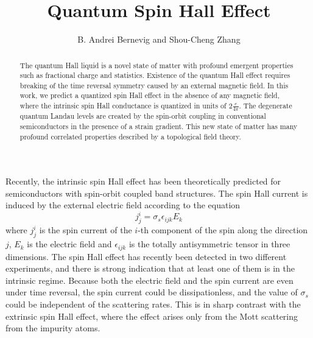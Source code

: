 \documentclass[prl,aps,amssymb,shownopacs,twocolumn]{revtex4}
\begin{document}
	
	
	
	
	\title{Quantum Spin Hall Effect}
	
	\author {B. Andrei Bernevig and Shou-Cheng Zhang}
	
	\begin{abstract}
		\begin{center}
			
			\parbox{14cm}{The quantum Hall liquid is a novel state of matter
				with profound emergent properties such as fractional charge and
				statistics. Existence of the quantum Hall effect requires breaking
				of the time reversal symmetry caused by an external magnetic field.
				In this work, we predict a quantized spin Hall effect in the absence
				of any magnetic field, where the intrinsic spin Hall conductance is
				quantized in units of $2 \frac{e}{4\pi}$. The degenerate quantum
				Landau levels are created by the spin-orbit coupling in conventional
				semiconductors in the presence of a strain gradient. This new state
				of matter has many profound correlated properties described by a
				topological field theory.}
			
		\end{center}
	\end{abstract}
	
	
	\maketitle
	
	Recently, the intrinsic spin Hall effect has been theoretically
	predicted for semiconductors with spin-orbit coupled band
	structures\cite{murakami2003,sinova2004}. The spin Hall current is
	induced by the external electric field according to the equation
	\begin{equation}
		j_j^i = \sigma_s \epsilon_{ijk} E_k \label{spin_response}
	\end{equation}
	where $j_j^i$ is the spin current of the $i$-th component of the
	spin along the direction $j$, $E_k$ is the electric field and
	$\epsilon_{ijk}$ is the totally antisymmetric tensor in three
	dimensions. The spin Hall effect has recently been detected in two
	different experiments\cite{kato2004A,wunderlich2004}, and there is
	strong indication that at least one of them is in the intrinsic
	regime\cite{bernevig2004A}. Because both the electric field and
	the spin current are even under time reversal, the spin current
	could be dissipationless, and the value of $\sigma_s$ could be
	independent of the scattering rates. This is in sharp contrast
	with the extrinsic spin Hall effect, where the effect arises only
	from the Mott scattering from the impurity atoms\cite{mott1929}.
	
\end{document}

